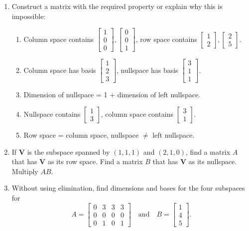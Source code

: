 \documentclass[14pt, a4paper]{article}
\begin{document}
\begin{enumerate}
    \item Construct a matrix with the required property or explain why this is impossible:
          \begin{enumerate}
              \item Column space contains $\begin{bmatrix} 1 \\ 0 \\ 0 \end{bmatrix}, \begin{bmatrix} 0 \\ 0 \\ 1 \end{bmatrix}$, row space contains $\begin{bmatrix} 1 \\ 2 \end{bmatrix}, \begin{bmatrix} 2 \\ 5 \end{bmatrix}$.
              \item Column space has basis $\begin{bmatrix} 1 \\ 2 \\ 3 \end{bmatrix}$, nullspace has basis $\begin{bmatrix} 3 \\ 1 \\ 1 \end{bmatrix}$.
              \item Dimension of nullspace = 1 + dimension of left nullspace.
              \item Nullspace contains $\begin{bmatrix} 1 \\ 3 \end{bmatrix}$, column space contains $\begin{bmatrix} 3 \\ 1 \end{bmatrix}$.
              \item Row space = column space, nullspace $\neq$ left nullspace.
          \end{enumerate}

    \item If $\mathbf{V}$ is the subspace spanned by $(1, 1, 1)$ and $(2, 1, 0)$, find a matrix $A$ that has $\mathbf{V}$ as its row space. Find a matrix $B$ that has $\mathbf{V}$ as its nullspace. Multiply $AB$.

    \item Without using elimination, find dimensions and bases for the four subspaces for
          \[
              A = \begin{bmatrix} 0 & 3 & 3 & 3 \\ 0 & 0 & 0 & 0 \\ 0 & 1 & 0 & 1 \end{bmatrix} \quad \text{and} \quad
              B = \begin{bmatrix} 1 \\ 4 \\ 5 \end{bmatrix}.
          \]


\end{enumerate}
\end{document}
